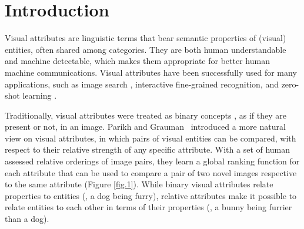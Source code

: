 \section{Introduction}

Visual attributes are linguistic terms that bear semantic properties of (visual) entities, often shared among categories. They are both human understandable and machine detectable, which makes them appropriate for better human machine communications. Visual attributes have been successfully used for many applications, such as image search \cite{whittlesearch}, interactive fine-grained recognition, \cite{branson13,branson10} and zero-shot learning \cite{6571196,parikh2011}. 

Traditionally, visual attributes were treated as binary concepts \cite{ferrari2007learning,Farhadi09describingobjects}, as if they are present or not, in an image. Parikh and Grauman~\cite{parikh2011} introduced a more natural view on visual attributes, in which pairs of visual entities can be compared, with respect to their relative strength of any specific attribute. With a set of human assessed relative orderings of image pairs, they learn a global ranking function for each attribute that can be used to compare a pair of two novel images respective to the same attribute (Figure \ref{fig.1}).
While binary visual attributes relate properties to entities (\eg, a dog being furry), relative attributes make it possible to relate entities to each other in terms of their properties (\eg, a bunny being furrier than a dog).

